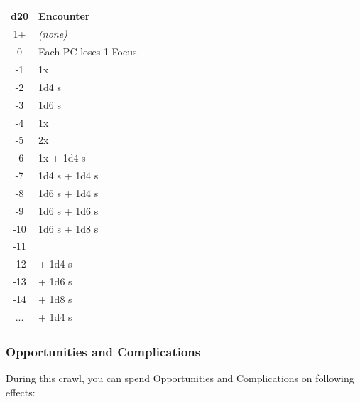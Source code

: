 \small
\noindent
\begin{tabular}{c l}
	d20 & Encounter \\ \hline
	1+  & \textit{(none)} \\
	0   & Each PC loses 1 Focus. \\
	-1  & 1x \enemyMidnightBeast{} \\
	-2  & 1d4 \enemyMidnightBeast{}s \\
	-3  & 1d6 \enemyMidnightBeast{}s \\
	-4  & 1x \enemyMidnightAssassin{} \\
	-5  & 2x \enemyMidnightAssassin{} \\
	-6  & 1x \enemyMidnightAssassin{} + 1d4 \enemyMidnightBeast{}s \\
	-7  & 1d4 \enemyMidnightAssassin{}s + 1d4 \enemyMidnightBeast{}s \\
	-8  & 1d6 \enemyMidnightAssassin{}s + 1d4 \enemyMidnightBeast{}s \\
	-9  & 1d6 \enemyMidnightAssassin{}s + 1d6 \enemyMidnightBeast{}s \\
	-10 & 1d6 \enemyMidnightAssassin{}s + 1d8 \enemyMidnightBeast{}s \\
	-11 & \enemyMidnightTwin{} \\
	-12 & \enemyMidnightTwin{} + 1d4 \enemyMidnightBeast{}s \\
	-13 & \enemyMidnightTwin{} + 1d6 \enemyMidnightBeast{}s \\
	-14 & \enemyMidnightTwin{} + 1d8 \enemyMidnightBeast{}s \\
	... & \enemyMidnightTwin{} + 1d4 \enemyMidnightAssassin{}s \\
\end{tabular}
\normalsize

\subsubsection{Opportunities and Complications}

During this crawl, you can spend Opportunities and Complications on following effects: \\



